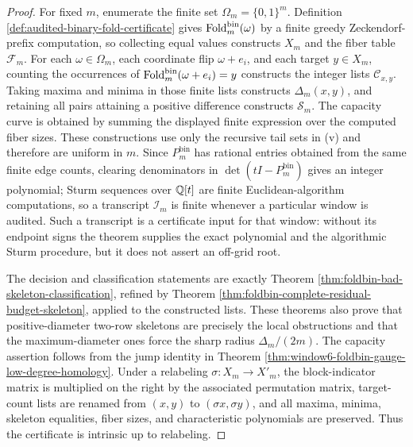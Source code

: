 \begin{proof}
For fixed \(m\), enumerate the finite set \(\Omega_m=\{0,1\}^m\).  Definition \ref{def:audited-binary-fold-certificate} gives \(\operatorname{Fold}_m^{\mathrm{bin}}(\omega)\) by a finite greedy Zeckendorf-prefix computation, so collecting equal values constructs \(X_m\) and the fiber table \(\mathcal F_m\).  For each \(\omega\in\Omega_m\), each coordinate flip \(\omega+e_i\), and each target \(y\in X_m\), counting the occurrences of \(\operatorname{Fold}_m^{\mathrm{bin}}(\omega+e_i)=y\) constructs the integer lists \(\mathcal C_{x,y}\).  Taking maxima and minima in those finite lists constructs \(\Delta_m(x,y)\), and retaining all pairs attaining a positive difference constructs \(\mathcal S_m\).  The capacity curve is obtained by summing the displayed finite expression over the computed fiber sizes.  These constructions use only the recursive tail sets in \textup{(v)} and therefore are uniform in \(m\).  Since \(P_m^{\mathrm{bin}}\) has rational entries obtained from the same finite edge counts, clearing denominators in \(\det(tI-P_m^{\mathrm{bin}})\) gives an integer polynomial; Sturm sequences over \(\mathbb{Q}[t]\) are finite Euclidean-algorithm computations, so a transcript \(\mathcal I_m\) is finite whenever a particular window is audited.  Such a transcript is a certificate input for that window: without its endpoint signs the theorem supplies the exact polynomial and the algorithmic Sturm procedure, but it does not assert an off-grid root.

The decision and classification statements are exactly Theorem \ref{thm:foldbin-bad-skeleton-classification}, refined by Theorem \ref{thm:foldbin-complete-residual-budget-skeleton}, applied to the constructed lists.  These theorems also prove that positive-diameter two-row skeletons are precisely the local obstructions and that the maximum-diameter ones force the sharp radius \(\Delta_m/(2m)\).  The capacity assertion follows from the jump identity in Theorem \ref{thm:window6-foldbin-gauge-low-degree-homology}.  Under a relabeling \(\sigma:X_m\to X'_m\), the block-indicator matrix is multiplied on the right by the associated permutation matrix, target-count lists are renamed from \((x,y)\) to \((\sigma x,\sigma y)\), and all maxima, minima, skeleton equalities, fiber sizes, and characteristic polynomials are preserved.  Thus the certificate is intrinsic up to relabeling.


\end{proof}
